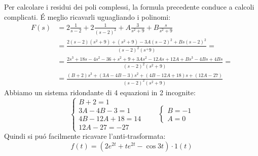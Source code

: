 Per calcolare i residui dei poli complessi, la formula precedente conduce a calcoli complicati. \'{E} meglio ricavarli uguagliando i polinomi:
\begin{align*}
	F(s) &= 2 \frac{1}{s-2} + 2 \frac{1}{(s-2)^2} + A \frac{3}{s^2+9} + B \frac{s}{s^2+9}\\
	&= \frac{2(s-2)(s^2+9)+(s^2+9)-3A(s-2)^2+Bs(s-2)^2}{(s-2)^2(s^+9)} = \\
	&= \frac{2s^3+18s-4s^2-36+s^2+9+3As^2-12As+12A+Bs^3-4Bs+4Bs}{(s-2)^2(s^2+9)} = \\
	&= \frac{(B+2)s^3 + (3A-4B-3)s^2 + (4B-12A+18)s + (12A-27)}{(s-2)^2(s^2+9)}
\end{align*}
Abbiamo un sistema ridondante di 4 equazioni in 2 incognite:
\[ 
\begin{cases}B+2=1\\3A-4B-3=1\\4B-12A+18=14\\12A-27=-27\end{cases} \qquad
\begin{cases}B=-1\\A=0\end{cases}
\]
Quindi si pu\'{o} facilmente ricavare l'anti-trasformata:
\[ f(t) = (2e^{2t} + t e^{2t} - \cos3t) \cdot 1(t) \]
%
%
